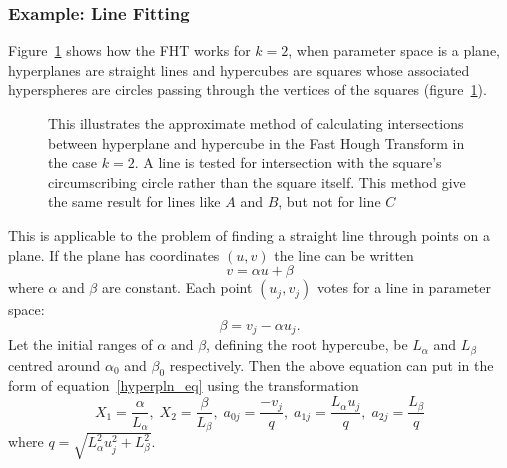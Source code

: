 \subsubsection{Example: Line Fitting} \label{line_fitting}
 Figure~\ref{hypercircle}
 shows how the FHT works for $k=2$, when parameter space is a plane,
 hyperplanes are straight lines and hypercubes are squares whose associated
 hyperspheres are circles passing through the vertices of the squares
 (figure~\ref{hypercircle}).
 \begin{figure}
     \centerline{}
     \caption[Calculating the intersection between hyperplanes and
	      hyperspheres.]
	     {This illustrates the approximate method of calculating
	      intersections between hyperplane and hypercube in the Fast Hough
	      Transform in the case $k=2$. A line is tested for intersection
	      with the square's circumscribing circle rather than the square
	      itself. This method give the same result for lines like $A$ and
	      $B$, but not for line $C$}
     \label{hypercircle}
 \end{figure}
 This is applicable to the
 problem of finding a straight line through points on a plane. If the
 plane has coordinates $(u,v)$ the line can be written
 \begin{displaymath}
   v=\alpha u + \beta
 \end{displaymath}
 where $\alpha$ and $\beta$ are constant. Each point
 $(u_j , v_j )$ votes for a line in parameter space:
 \begin{displaymath}
     \beta=v_j - \alpha u_j .
 \end{displaymath}
 Let the initial ranges of $\alpha$ and $\beta$, defining the root
 hypercube, be $L_{\alpha}$ and
 $L_{\beta}$ centred around $\alpha_0$ and $\beta_0$ respectively.
 Then the above equation can put in the form of
 equation~\ref{hyperpln_eq} using the transformation
 \begin{displaymath}
     X_1 = \frac{\alpha}{L_\alpha} ,\;
     X_2 = \frac{\beta}{L_\beta} ,\;
     a_{0j} = \frac{- v_j}{q} ,\;
     a_{1j} = \frac{L_\alpha u_j}{q} ,\;
     a_{2j} = \frac{L_\beta}{q}
 \end{displaymath}
 where $q = \sqrt{L_\alpha^2 u_j^2 + L_\beta^2}$.

